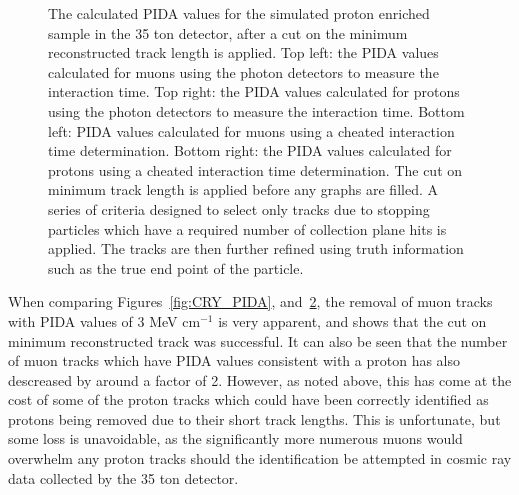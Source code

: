 \begin{figure}
\begin{subfigure}{0.48\textwidth}
        \label{fig:CRY_PIDACuts_Muon_Cheat}
  \end{subfigure}
  \caption[The calculated PIDA values for the simulated proton enriched sample in the 35 ton detector, after a cut on the minimum reconstructed track length is applied]
          {The calculated PIDA values for the simulated proton enriched sample in the 35 ton detector, after a cut on the minimum reconstructed track length is applied. Top left: the PIDA values calculated for muons using the photon detectors to measure the interaction time. Top right: the PIDA values calculated for protons using the photon detectors to measure the interaction time. Bottom left: PIDA values calculated for muons using a cheated interaction time determination. Bottom right: the PIDA values calculated for protons using a cheated interaction time determination. The cut on minimum track length is applied before any graphs are filled. A series of criteria designed to select only tracks due to stopping particles which have a required number of collection plane hits is applied. The tracks are then further refined using truth information such as the true end point of the particle.}
  \label{fig:CRY_PIDACuts}
\end{figure}

When comparing Figures~\ref{fig:CRY_PIDA}, and~\ref{fig:CRY_PIDACuts}, the removal of muon tracks with PIDA values of 3 MeV cm$^{-1}$ is very apparent, and shows that the cut on minimum reconstructed track was successful. It can also be seen that the number of muon tracks which have PIDA values consistent with a proton has also descreased by around a factor of 2. However, as noted above, this has come at the cost of some of the proton tracks which could have been correctly identified as protons being removed due to their short track lengths. This is unfortunate, but some loss is unavoidable, as the significantly more numerous muons would overwhelm any proton tracks should the identification be attempted in cosmic ray data collected by the 35 ton detector. 

